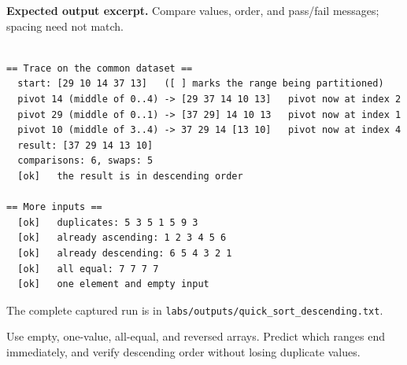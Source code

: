 \textbf{Expected output excerpt.} Compare values, order, and pass/fail messages; spacing need not match.

\begin{lstlisting}[style=utpterminal,language={}]

== Trace on the common dataset ==
  start: [29 10 14 37 13]   ([ ] marks the range being partitioned)
  pivot 14 (middle of 0..4) -> [29 37 14 10 13]   pivot now at index 2
  pivot 29 (middle of 0..1) -> [37 29] 14 10 13   pivot now at index 1
  pivot 10 (middle of 3..4) -> 37 29 14 [13 10]   pivot now at index 4
  result: [37 29 14 13 10]
  comparisons: 6, swaps: 5
  [ok]   the result is in descending order

== More inputs ==
  [ok]   duplicates: 5 3 5 1 5 9 3
  [ok]   already ascending: 1 2 3 4 5 6
  [ok]   already descending: 6 5 4 3 2 1
  [ok]   all equal: 7 7 7 7
  [ok]   one element and empty input

\end{lstlisting}

The complete captured run is in \texttt{labs/outputs/quick\_sort\_descending.txt}.

\begin{tryit}

Use empty, one-value, all-equal, and reversed arrays. Predict which ranges end immediately, and verify descending order without losing duplicate values.

\end{tryit}

